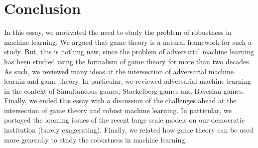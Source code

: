 \section{Conclusion}
In this essay, we motivated the need to study the problem of robustness in machine learning. We argued that game theory
is a natural framework for such a study. But, this is nothing new, since the problem of adversarial machine learning has
been studied using the formalism of game theory for more than two decades. As such, we reviewed many ideas at the intersection
of adversarial machine learnin and game theory. In particular, we reviewed adversarial machine learning in the context of
Simultaneous games, Stackelberg games and Bayesian games. Finally, we ended this essay with a discussion of the challenges ahead
at the intersection of game theory and robust machine learning. In particular, we portayed the looming issues of the recent large
scale models on our democratic institution (barely exagerating). Finally, we related how game theory can be used more generally
to study the robustness in machine learning.